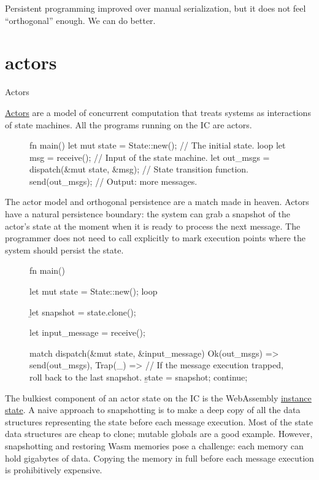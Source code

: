 \documentclass{article}
\begin{document}
Persistent programming improved over manual serialization, but it does not feel ``orthogonal'' enough.
We can do better.

\section{actors}{Actors}

\href{https://en.wikipedia.org/wiki/Actor_model}{Actors} are a model of concurrent computation that treats systems as interactions of state machines.
All the programs running on the IC are actors.

\begin{figure}
\begin{code}[rust]
fn main() {
  let mut state = State::new();                // The initial state.
  loop {
    let msg = receive();                       // Input of the state machine.
    let out_msgs = dispatch(&mut state, &msg); // State transition function.
    send(out_msgs);                            // Output: more messages.
  }
}
\end{code}
\end{figure}

The actor model and orthogonal persistence are a match made in heaven.
Actors have a natural persistence boundary: the system can grab a snapshot of the actor's state at the moment when it is ready to process the next message.
The programmer does not need to call  explicitly to mark execution points where the system should persist the state.

\begin{figure}
\begin{code}[rust]
fn main() {
  let mut state = State::new();
  loop {
    \b{let snapshot = state.clone();}

    let input_message = receive();

    match dispatch(&mut state, &input_message) {
      Ok(out_msgs) => send(out_msgs),
      Trap(_) => {
        // If the message execution trapped, roll back to the last snapshot.
        \b{state = snapshot;}
        continue;
      }
    }
  }
}
\end{code}
\end{figure}

The bulkiest component of an actor state on the IC is the WebAssembly \href{https://webassembly.github.io/spec/core/exec/runtime.html#module-instances}{instance state}.
A naive approach to snapshotting is to make a deep copy of all the data structures representing the state before each message execution.
Most of the state data structures are cheap to clone; mutable globals are a good example.
However, snapshotting and restoring Wasm memories pose a challenge: each memory can hold gigabytes of data.
Copying the memory in full before each message execution is prohibitively expensive.
\end{document}
